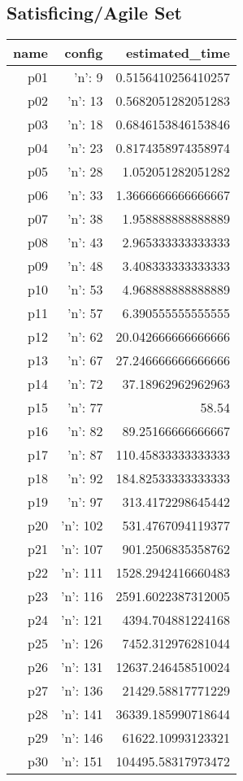 \documentclass{article}
\begin{document}
                                \subsection*{Satisficing/Agile Set}
                                
                            \begin{center}
                            \scriptsize
                            \begin{tabular}{r|r|r}
                            name & config & estimated\_time\\\midrule
                              p01&{'n': 9}&0.5156410256410257\\
  p02&{'n': 13}&0.5682051282051283\\
  p03&{'n': 18}&0.6846153846153846\\
  p04&{'n': 23}&0.8174358974358974\\
  p05&{'n': 28}&1.052051282051282\\
  p06&{'n': 33}&1.3666666666666667\\
  p07&{'n': 38}&1.958888888888889\\
  p08&{'n': 43}&2.965333333333333\\
  p09&{'n': 48}&3.408333333333333\\
  p10&{'n': 53}&4.968888888888889\\
  p11&{'n': 57}&6.390555555555555\\
  p12&{'n': 62}&20.042666666666666\\
  p13&{'n': 67}&27.246666666666666\\
  p14&{'n': 72}&37.18962962962963\\
  p15&{'n': 77}&58.54\\
  p16&{'n': 82}&89.25166666666667\\
  p17&{'n': 87}&110.45833333333333\\
  p18&{'n': 92}&184.82533333333333\\
  p19&{'n': 97}&313.4172298645442\\
  p20&{'n': 102}&531.4767094119377\\
  p21&{'n': 107}&901.2506835358762\\
  p22&{'n': 111}&1528.2942416660483\\
  p23&{'n': 116}&2591.6022387312005\\
  p24&{'n': 121}&4394.704881224168\\
  p25&{'n': 126}&7452.312976281044\\
  p26&{'n': 131}&12637.246458510024\\
  p27&{'n': 136}&21429.58817771229\\
  p28&{'n': 141}&36339.185990718644\\
  p29&{'n': 146}&61622.10993123321\\
  p30&{'n': 151}&104495.58317973472
                            \end{tabular}
                            \end{center}
                    
\end{document}
